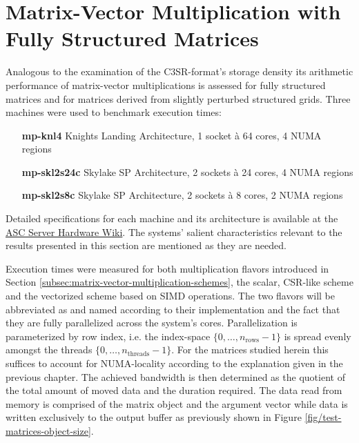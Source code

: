 

  \section{Matrix-Vector Multiplication with Fully Structured Matrices} \label{sec:mvm-structured}

    Analogous to the examination of the C3SR-format's storage density its arithmetic performance of matrix-vector
    multiplications is assessed for fully structured matrices and for matrices derived from slightly perturbed
    structured grids. Three machines were used to benchmark execution times: 

    \begin{itemize}[leftmargin=5cm]
      \item[\textbf{mp-knl4}] {Knights Landing Architecture, 1 socket à 64 cores, 4 NUMA regions}
      \item[\textbf{mp-skl2s24c}] {Skylake SP Architecture, 2 sockets à 24 cores, 4 NUMA regions}
      \item[\textbf{mp-skl2s8c}] {Skylake SP Architecture, 2 sockets à 8 cores, 2 NUMA regions} 
    \end{itemize}

    Detailed specifications for each machine and its architecture is available at the \href{\ascWiki}{ASC Server
    Hardware Wiki}. The systems' salient characteristics relevant to the results presented in this section are mentioned
    as they are needed. 

    Execution times were measured for both multiplication flavors introduced in Section
    \ref{subsec:matrix-vector-multiplication-schemes}, the scalar, CSR-like scheme and the vectorized scheme based on
    SIMD operations. The two flavors will be abbreviated as  and  named according to
    their implementation and the fact that they are fully parallelized across the system's cores. Parallelization is
    parameterized by row index, i.e. the index-space $\{0, \ldots, n_{\text{rows}} - 1\}$ is spread evenly amongst the
    threads $\{0, \ldots, n_\text{threads} - 1\}$. For the matrices studied herein this suffices to account for
    NUMA-locality according to the explanation given in the previous chapter. The achieved bandwidth is then determined
    as the quotient of the total amount of moved data and the duration required. The data read from memory is comprised
    of the matrix object and the argument vector while data is written exclusively to the output buffer as previously
    shown in Figure \ref{fig/test-matrices-object-size}.

